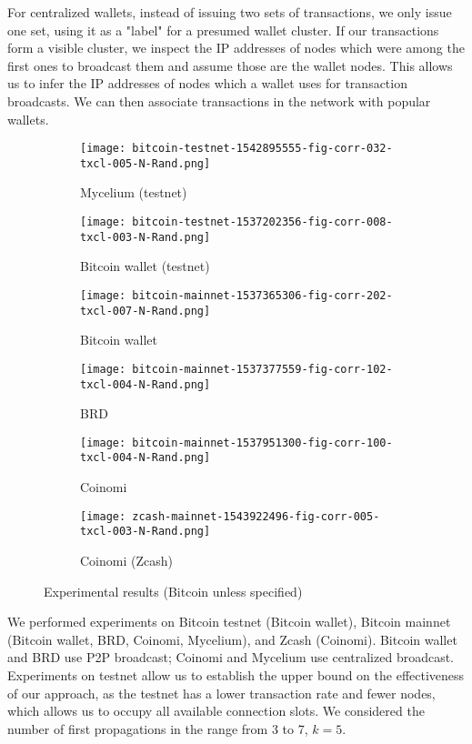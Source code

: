 For centralized wallets, instead of issuing two sets of transactions, we only issue one set, using it as a "label" for a presumed wallet cluster.
If our transactions form a visible cluster, we inspect the IP addresses of nodes which were among the first ones to broadcast them and assume those are the wallet nodes.
This allows us to infer the IP addresses of nodes which a wallet uses for transaction broadcasts.
We can then associate transactions in the network with popular wallets.

\begin{figure}
	\centering
	\begin{subfigure}{.5\textwidth}
		\centering
		\texttt{[image: bitcoin-testnet-1542895555-fig-corr-032-txcl-005-N-Rand.png]}
		\caption{Mycelium (testnet)}
	\end{subfigure}%
	\begin{subfigure}{.5\textwidth}
		\centering
		\texttt{[image: bitcoin-testnet-1537202356-fig-corr-008-txcl-003-N-Rand.png]}
		\caption{Bitcoin wallet (testnet)}
	\end{subfigure}
	\begin{subfigure}{.5\textwidth}
		\centering
		\texttt{[image: bitcoin-mainnet-1537365306-fig-corr-202-txcl-007-N-Rand.png]}
		\caption{Bitcoin wallet}
	\end{subfigure}%
	\begin{subfigure}{.5\textwidth}
		\centering
		\texttt{[image: bitcoin-mainnet-1537377559-fig-corr-102-txcl-004-N-Rand.png]}
		\caption{BRD}
	\end{subfigure}
	\begin{subfigure}{.5\textwidth}
		\centering
		\texttt{[image: bitcoin-mainnet-1537951300-fig-corr-100-txcl-004-N-Rand.png]}
		\caption{Coinomi}
	\end{subfigure}%
	\begin{subfigure}{.5\textwidth}
		\centering
		\texttt{[image: zcash-mainnet-1543922496-fig-corr-005-txcl-003-N-Rand.png]}
		\caption{Coinomi (Zcash)}
	\end{subfigure}
	\caption[short]{Experimental results (Bitcoin unless specified)}
	\label{fig:clustering-all}
\end{figure}

We performed experiments on Bitcoin testnet (Bitcoin wallet), Bitcoin mainnet (Bitcoin wallet, BRD, Coinomi, Mycelium), and Zcash (Coinomi).
Bitcoin wallet and BRD use P2P broadcast; Coinomi and Mycelium use centralized broadcast.
Experiments on testnet allow us to establish the upper bound on the effectiveness of our approach, as the testnet has a lower transaction rate and fewer nodes, which allows us to occupy all available connection slots.
We considered the number of first propagations in the range from 3 to 7, $k = 5$.

